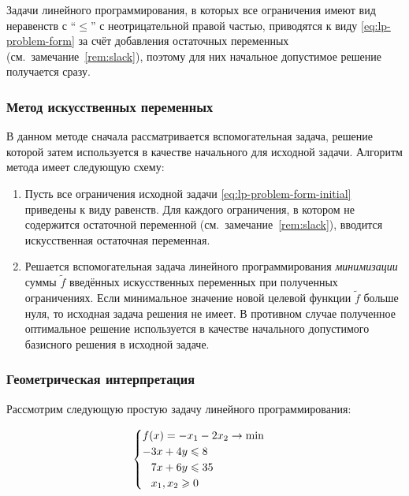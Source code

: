 \begin{rem}
  \label{rem:slack-solution}
  Задачи линейного программирования, в которых все ограничения имеют
  вид неравенств с ``$\leq$'' с неотрицательной правой частью,
  приводятся к виду \eqref{eq:lp-problem-form} за счёт добавления
  остаточных переменных (см. замечание \ref{rem:slack}), поэтому для
  них начальное допустимое решение получается сразу.
\end{rem}

\subsubsection{Метод искусственных переменных}

В данном методе сначала рассматривается вспомогательная задача,
решение которой затем используется в качестве начального для исходной
задачи. Алгоритм метода имеет следующую схему:

\begin{enumerate}
  \renewcommand{\labelenumi}{\textbf{Шаг \arabic{enumi}.}}
\item Пусть все ограничения исходной задачи
  \eqref{eq:lp-problem-form-initial} приведены к виду равенств. Для
  каждого ограничения, в котором не содержится остаточной переменной
  (см. замечание \ref{rem:slack}), вводится искусственная остаточная
  переменная.
\item Решается вспомогательная задача линейного программирования
  \emph{минимизации} суммы $\tilde{f}$ введённых искусственных
  переменных при полученных ограничениях. Если минимальное значение
  новой целевой функции $\tilde{f}$ больше нуля, то исходная задача
  решения не имеет. В противном случае полученное оптимальное решение
  используется в качестве начального допустимого базисного решения в
  исходной задаче.
\end{enumerate}

\subsubsection{Геометрическая интерпретация}
\label{sec:simplex-geom}

Рассмотрим следующую простую задачу линейного программирования:

\begin{equation}
  \label{eq:lp-simple}
  \begin{cases}
    f(x) = -x_1-2x_2 \to \min \\
    -3x+4y \leq 8 \\
    \phm 7x+6y \leq 35 \\
    \phm x_1, x_2 \geq 0
  \end{cases}
\end{equation}

